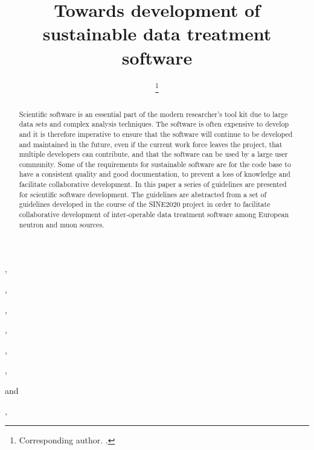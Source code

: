 \documentclass[jnr]{iosart2x}
\begin{document}
\begin{frontmatter}

\title{Towards development of sustainable data treatment software}

\author[A]{ %
\thanks{Corresponding author. .}},
\author[A]{ },
\author[A]{ },
\author[A]{ },
\author[B]{ },
\author[C]{ },
\author[D]{ }
and
\author[E]{ },


\address[A]{,}
\address[B]{,}
\address[C]{,}
\address[D]{,}
\address[E]{,}

\begin{abstract}
Scientific software is an essential part of the modern researcher's tool kit due to large data sets and complex analysis techniques. 
The software is often expensive to develop and it is therefore imperative to ensure that the software will continue to be developed and maintained in the future, even if the current work force leaves the project, that multiple developers can contribute, and that the software can be used by a large user community.
Some of the requirements for sustainable software are for the code base to have a consistent quality and good documentation, to prevent a loss of knowledge and facilitate collaborative development. 
In this paper a series of guidelines are presented for scientific software development. The guidelines are abstracted from a set of guidelines developed in the course of the SINE2020 project in order to facilitate collaborative development of inter-operable data treatment software among European neutron and muon sources.


\end{abstract}

\begin{keyword}
\end{keyword}

\end{frontmatter}
\end{document}
